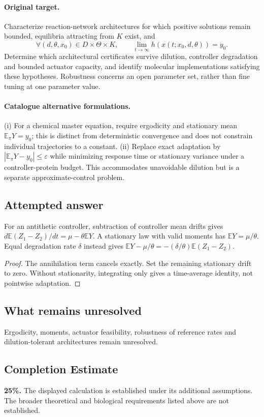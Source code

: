 \documentclass[11pt]{article}
\begin{document}
\paragraph{Original target.}
Characterize reaction-network architectures for which positive solutions remain bounded, equilibria attracting from $K$ exist, and
\[\forall(d,\theta,x_0)\in D\times\Theta\times K,\qquad \lim_{t\to\infty}h(x(t;x_0,d,\theta))=y_0.\]
Determine which architectural certificates survive dilution, controller degradation and bounded actuator capacity, and identify molecular implementations satisfying these hypotheses. Robustness concerns an open parameter set, rather than fine tuning at one parameter value.
\paragraph{Catalogue alternative formulations.}
(i) For a chemical master equation, require ergodicity and stationary mean $\mathbb{E}_\pi Y=y_0$; this is distinct from deterministic convergence and does not constrain individual trajectories to a constant. (ii) Replace exact adaptation by $|\mathbb{E}_\pi Y-y_0|\le\varepsilon$ while minimizing response time or stationary variance under a controller-protein budget. This accommodates unavoidable dilution but is a separate approximate-control problem.
\subsection{Attempted answer}
\begin{proposition}
For an antithetic controller, subtraction of controller mean drifts gives $d\mathbb{E}(Z_1-Z_2)/dt=\mu-\theta\mathbb{E} Y$. A stationary law with valid moments has $\mathbb{E} Y=\mu/\theta$. Equal degradation rate $\delta$ instead gives $\mathbb{E} Y-\mu/\theta=-(\delta/\theta)\mathbb{E}(Z_1-Z_2)$.
\end{proposition}
\begin{proof}
The annihilation term cancels exactly. Set the remaining stationary drift to zero. Without stationarity, integrating only gives a time-average identity, not pointwise adaptation.
\end{proof}
\subsection{What remains unresolved}
Ergodicity, moments, actuator feasibility, robustness of reference rates and dilution-tolerant architectures remain unresolved.
\subsection{Completion Estimate}
\textbf{25\%.} The displayed calculation is established under its additional assumptions. The broader theoretical and biological requirements listed above are not established.
\end{document}
